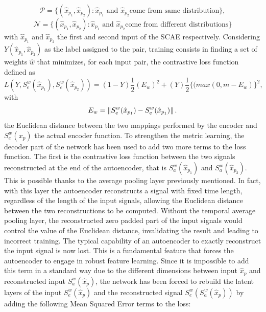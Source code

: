 \begin{equation}
\label{eq:positive}
\mathcal{P} = \{(\hat{x}_{p_1}, \hat{x}_{p_2} ) : \hat{x}_{p_1} \textrm{ and } \hat{x}_{p_2} \textrm{come from same distribution}\},
\end{equation}
\begin{equation}
\label{eq:negative}
\mathcal{N} = \{(\hat{x}_{p_1}, \hat{x}_{p_2} ) : \hat{x}_{p_1} \textrm{ and }  \hat{x}_{p_2} \textrm{come from different distributions}\}
\end{equation}
with $\hat{x}_{p_1}$ and $\hat{x}_{p_2}$ the first and second input of the SCAE respectively.
Considering $Y(\hat{x}_{p_1}, \hat{x}_{p_2})$ as the label assigned to the pair, training consists in finding a set of weights $\hat{w}$ that minimizes, for each input pair, the contrastive loss function defined as 
\begin{equation}
L(Y, S_e^w(\hat{x}_{p_1}),  S_e^w( \hat{x}_{p_2})) = (1 - Y)\frac{1}{2}(E_w)^2 + (Y)\frac{1}{2}\{(max(0, m - E_w)\}^2,
\end{equation}
with 
\begin{equation}
E_w = \left\lVert S_e^w (\hat{x}_{p_1}) - S_e^w (\hat{x}_{p_1})\right\rVert.
\end{equation}
the Euclidean distance between the two mappings performed by the encoder and $S_e^w(x_p)$ the actual encoder function.
To strengthen the metric learning, the decoder part of the network has been used to add two more terms to the loss function. The first is the contrastive loss function between the two signals reconstructed at the end of the autoencoder, that is $S_a^w(\hat{x}_{p_1})$ and $S_a^w(\hat{x}_{p_2})$. This is possible thanks to the average pooling layer previously mentioned. In fact, with this layer the autoencoder reconstructs a signal with fixed time length, regardless of the length of the input signals, allowing the Euclidean distance between the two reconstructions to be computed. Without the temporal average pooling layer, the reconstructed zero padded part of the input signals would control the value of the Euclidean distance, invalidating the result and leading to incorrect training. The typical capability of an autoencoder to exactly reconstruct the input signal is now lost. This is a fundamental feature that forces the autoencoder to engage in robust feature learning. Since it is impossible to add this term in a standard way due to the different dimensions between input $\hat{x}_{p}$ and reconstructed input $S_a^w(\hat{x}_{p})$, the network has been forced to rebuild the latent layers of the input $S_e^w(\hat{x}_{p})$ and the reconstructed signal $S_e^w(S_a^w(\hat{x}_{p}))$ by adding the following Mean Squared Error terms to the loss:

